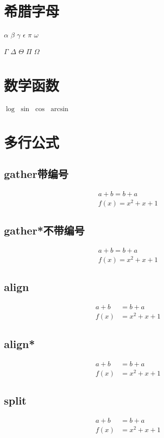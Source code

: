 \documentclass{article}
\begin{document}
  \section{希腊字母}
	$\alpha$
	$\beta$
	$\gamma$
	$\epsilon$
	$\pi$
	$\omega$
	
	$\Gamma$
	$\Delta$
	$\Theta$
	$\Pi$
	$\Omega$

  \section{数学函数}
	$\log$
	$\sin$
	$\cos$
	$\arcsin$

  \section{多行公式}
	\subsection{gather带编号}
	\begin{gather}
		a+b=b+a \\
		f(x)=x^2+x+1
	\end{gather}
	\subsection{gather*不带编号}
	\begin{gather*}
		a+b=b+a \\
		f(x)=x^2+x+1
	\end{gather*}
	\subsection{align}
	\begin{align}
		a+b&=b+a \\
		f(x)&=x^2+x+1
	\end{align}
	\subsection{align*}
	\begin{align*}
		a+b&=b+a \\
		f(x)&=x^2+x+1
	\end{align*}
	\subsection{split}
	\begin{equation}
		\begin{split}
			a+b&=b+a \\
			f(x)&=x^2+x+1
		\end{split}
	\end{equation}
\end{document}
